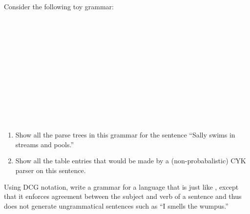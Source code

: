 \begin{iexercise}
Consider the following toy grammar:
\begin{squote}
 \bnfeq {}  \\
 \bnfeq {} \\
 \bnfeq {}   \\
 \bnfeq {}  \\
 \bnfeq {} \\
 \bnfeq {}   \\
 \bnfeq {}  \\
 \bnfeq {}  \\
\\
 \bnfeq {} \bnfor {} \bnfor {} \bnfor {} \\
 \bnfeq {} \\
 \bnfeq {} \bnfor {} \bnfor {}
\end{squote}
\begin{enumerate}
\item Show all the parse trees in this grammar for the sentence ``Sally swims in 
streams and pools.''
\item Show all the table entries  that would be made by a (non-probabalistic) CYK parser
on this sentence.
\end{enumerate}

\end{iexercise} 

\begin{exercise}
Using DCG notation, write a grammar for a language that is just like
, except that it enforces agreement between the subject and verb of a
sentence and thus does not generate ungrammatical sentences such as ``I smells the wumpus.''
\end{exercise} 

